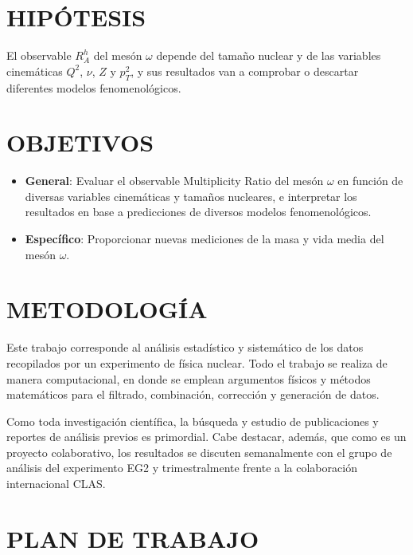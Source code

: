 \section{HIPÓTESIS}

El observable $R^h_A$ del mesón $\omega$ depende del tamaño nuclear y de las variables cinemáticas $Q^2$, $\nu$, $Z$ y $p_T^2$, y sus resultados van a comprobar o descartar diferentes modelos fenomenológicos.

\section{OBJETIVOS}

\begin{itemize}
    \item \textbf{General}: Evaluar el observable Multiplicity Ratio del mesón $\omega$ en función de diversas variables cinemáticas y tamaños nucleares, e interpretar los resultados en base a predicciones de diversos modelos fenomenológicos.
    \item \textbf{Específico}: Proporcionar nuevas mediciones de la masa y vida media del mesón $\omega$.
\end{itemize}

\section{METODOLOGÍA}

Este trabajo corresponde al análisis estadístico y sistemático de los datos recopilados por un experimento de física nuclear. Todo el trabajo se realiza de manera computacional, en donde se emplean argumentos físicos y métodos matemáticos para el filtrado, combinación, corrección y generación de datos.

Como toda investigación científica, la búsqueda y estudio de publicaciones y reportes de análisis previos es primordial. Cabe destacar, además, que como es un proyecto colaborativo, los resultados se discuten semanalmente con el grupo de análisis del experimento EG2 y trimestralmente frente a la colaboración internacional CLAS.

\section{PLAN DE TRABAJO}

